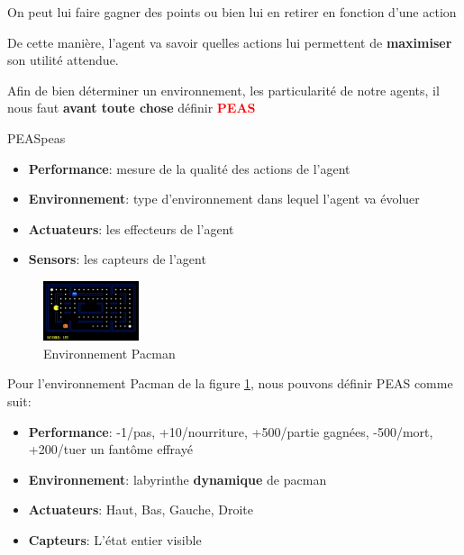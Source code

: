 \begin{example}\leavevmode
    On peut lui faire gagner des points ou bien lui en retirer en fonction d'une action
\end{example}
De cette manière, l'agent va savoir quelles actions lui permettent de \textbf{maximiser} son utilité attendue.

Afin de bien déterminer un environnement, les particularité de notre agents, il nous faut 
\textbf{avant toute chose} définir \textbf{\textcolor{red}{PEAS}}

\begin{definition}{PEAS}{peas}
    \begin{itemize}
        \item \textbf{Performance}: mesure de la qualité des actions de l'agent
        \item \textbf{Environnement}: type d'environnement dans lequel l'agent va évoluer
        \item \textbf{Actuateurs}: les effecteurs de l'agent
        \item \textbf{Sensors}: les capteurs de l'agent
    \end{itemize} 
\end{definition}

\begin{figure}[H]
    \begin{center}
        \includegraphics[width=0.25\textwidth]{./pictures/pacman.png}
    \end{center}
    \caption{Environnement Pacman}\label{fig:pacman}
\end{figure}

\begin{example}\leavevmode
    Pour l'environnement Pacman de la figure \ref{fig:pacman}, nous pouvons définir PEAS comme suit:
    \begin{itemize}
        \item \textbf{Performance}: -1/pas, +10/nourriture, +500/partie gagnées, -500/mort, +200/tuer un fantôme effrayé
        \item \textbf{Environnement}: labyrinthe \textbf{dynamique }de pacman
        \item \textbf{Actuateurs}: Haut, Bas, Gauche, Droite
        \item \textbf{Capteurs}: L'état entier visible
    \end{itemize}



\end{example}

